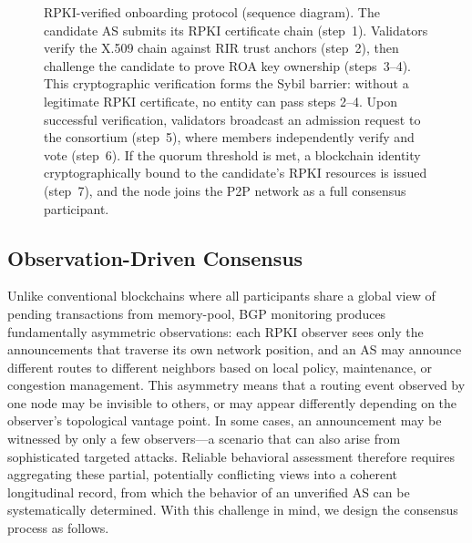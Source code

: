 \begin{figure}[t]
{
}%
\caption{RPKI-verified onboarding protocol (sequence diagram). The candidate AS submits its RPKI certificate chain (step~1). Validators verify the X.509 chain against RIR trust anchors (step~2), then challenge the candidate to prove ROA key ownership (steps~3--4). This cryptographic verification forms the Sybil barrier: without a legitimate RPKI certificate, no entity can pass steps 2--4. Upon successful verification, validators broadcast an admission request to the consortium (step~5), where members independently verify and vote (step~6). If the quorum threshold is met, a blockchain identity cryptographically bound to the candidate's RPKI resources is issued (step~7), and the node joins the P2P network as a full consensus participant.}
\label{fig:onboarding}
\end{figure}

\subsection{Observation-Driven Consensus}
 Unlike conventional blockchains where all participants share a global view of pending transactions from memory-pool, BGP monitoring produces fundamentally asymmetric observations: each RPKI observer sees only the announcements that traverse its own network position, and an AS may announce different routes to different neighbors based on local policy, maintenance, or congestion management. This asymmetry means that a routing event observed by one node may be invisible to others, or may appear differently depending on the observer's topological vantage point. In some cases, an announcement may be witnessed by only a few observers—a scenario that can also arise from sophisticated targeted attacks. Reliable behavioral assessment therefore requires aggregating these partial, potentially conflicting views into a coherent longitudinal record, from which the behavior of an unverified AS can be systematically determined. With this challenge in mind, we design the consensus process as follows.


